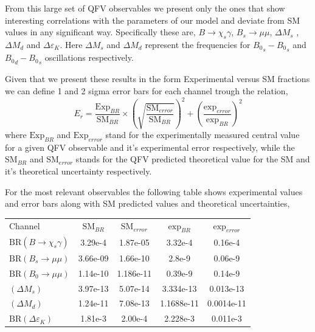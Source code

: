 From this large set of QFV observables we present only the ones that show interesting correlations with the parameters of our model and deviate from SM values in any significant way.
%
Specifically these are, $B \rightarrow \chi_s \gamma$, $B_s \rightarrow \mu \mu$, $\Delta M_s$ , $\Delta M_d$ and $\Delta \varepsilon_K$. 
%
Here $\Delta M_s$ and $\Delta M_d$ represent the frequencies for ${B_0}_s - {B_0}_s$ and ${B_0}_d - {B_0}_s$ oscillations respectively. 
 
Given that we present these results in the form Experimental versus SM fractions we can define 1 and 2 sigma error bars for each channel trough the relation, 
%
%
\begin{equation}
E_r = \frac{\text{Exp}_{BR}}{\text{SM}_{BR}} \times \left( \sqrt{\frac{\text{SM}_{error}}{\text{SM}_{BR}}}\right)^2 + \left( \frac{\text{exp}_{error}}{\text{exp}_{BR}} \right)^2
\end{equation} 
%
where $\text{Exp}_{BR}$ and $\text{Exp}_{error}$ stand for the experimentally measured central value for a given QFV observable and it's experimental error respectively, while the $\text{SM}_{BR}$ and $\text{SM}_{error}$ stands for the QFV predicted theoretical value for the SM and it's theoretical uncertainty respectively. 

For the most relevant observables the following table shows  experimental values and error bars along with SM predicted values and theoretical uncertainties, 
%
\begin{table}[H]
\centering
\begin{tabular}{l|cccc}
 Channel & $\text{SM}_{BR}$         & $\text{SM}_{error}$ & $\text{exp}_{BR}$ & $\text{exp}_{error}$   \\ \cline{2-5} 
$\text{BR}( B \rightarrow \chi_s \gamma )$ & 3.29e-4 & 1.87e-05 & 3.32e-4 & 0.16e-4 \\
$\text{BR}( B_s \rightarrow \mu \mu ) $ & 3.66e-09 & 1.66e-10 & 2.8e-9 & 0.06e-9       \\
$\text{BR}(B_0 \rightarrow  \mu \mu )$ & 1.14e-10 & 1.186e-11 & 0.39e-9    & 0.14e-9       \\
$( \Delta M_s )$ & 3.97e-13 & 5.07e-14 & 3.334e-13  &  0.013e-13  \\
$( \Delta M_d )$ & 1.24e-11 & 7.08e-13 & 1.1688e-11 &  0.0014e-11  \\
$\text{BR}(\Delta \varepsilon_K )$ & 1.81e-3  & 2.00e-4 & 2.228e-3  & 0.011e-3     
\end{tabular}
\end{table}

